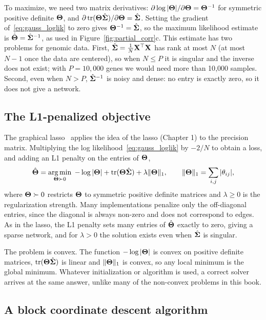To maximize, we need two matrix derivatives: $\partial\log|\boldsymbol{\Theta}|/\partial\boldsymbol{\Theta}=\boldsymbol{\Theta}^{-1}$ for symmetric positive definite $\boldsymbol{\Theta}$, and $\partial\operatorname{tr}(\boldsymbol{\Theta}\hat{\boldsymbol{\Sigma}})/\partial\boldsymbol{\Theta}=\hat{\boldsymbol{\Sigma}}$. Setting the gradient of~\eqref{eq:gauss_loglik} to zero gives $\boldsymbol{\Theta}^{-1}=\hat{\boldsymbol{\Sigma}}$, so the maximum likelihood estimate is $\hat{\boldsymbol{\Theta}}=\hat{\boldsymbol{\Sigma}}^{-1}$, as used in Figure~\ref{fig:partial_corr}c. This estimate has two problems for genomic data. First, $\hat{\boldsymbol{\Sigma}}=\frac1N\mathbf{X}^\top\mathbf{X}$ has rank at most $N$ (at most $N-1$ once the data are centered), so when $N\le P$ it is singular and the inverse does not exist; with $P=10{,}000$ genes we would need more than 10{,}000 samples. Second, even when $N>P$, $\hat{\boldsymbol{\Sigma}}^{-1}$ is noisy and dense: no entry is exactly zero, so it does not give a network.

\subsection{The L1-penalized objective}

The graphical lasso~\citep{friedman2008,yuan2007,banerjee2008} applies the idea of the lasso (Chapter 1) to the precision matrix. Multiplying the log likelihood~\eqref{eq:gauss_loglik} by $-2/N$ to obtain a loss, and adding an L1 penalty on the entries of $\boldsymbol{\Theta}$,
\begin{equation}
  \hat{\boldsymbol{\Theta}} = \operatorname*{arg\,min}_{\boldsymbol{\Theta}\succ 0}\; -\log|\boldsymbol{\Theta}| + \operatorname{tr}(\boldsymbol{\Theta}\hat{\boldsymbol{\Sigma}}) + \lambda\|\boldsymbol{\Theta}\|_1,
  \qquad \|\boldsymbol{\Theta}\|_1=\sum_{i,j}|\theta_{ij}|,
  \label{eq:glasso}
\end{equation}
where $\boldsymbol{\Theta}\succ0$ restricts $\boldsymbol{\Theta}$ to symmetric positive definite matrices and $\lambda\ge0$ is the regularization strength. Many implementations penalize only the off-diagonal entries, since the diagonal is always non-zero and does not correspond to edges. As in the lasso, the L1 penalty sets many entries of $\hat{\boldsymbol{\Theta}}$ exactly to zero, giving a sparse network, and for $\lambda>0$ the solution exists even when $\hat{\boldsymbol{\Sigma}}$ is singular.

The problem is convex. The function $-\log|\boldsymbol{\Theta}|$ is convex on positive definite matrices, $\operatorname{tr}(\boldsymbol{\Theta}\hat{\boldsymbol{\Sigma}})$ is linear and $\|\boldsymbol{\Theta}\|_1$ is convex, so any local minimum is the global minimum. Whatever initialization or algorithm is used, a correct solver arrives at the same answer, unlike many of the non-convex problems in this book.

\subsection{A block coordinate descent algorithm}

